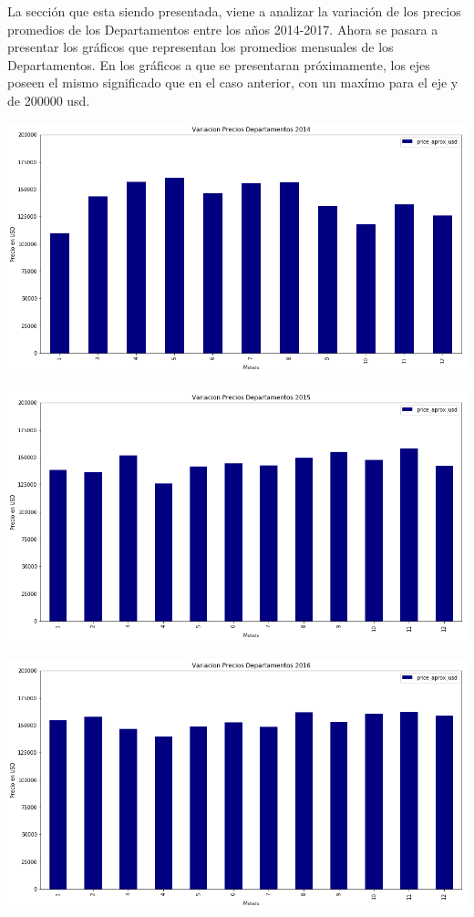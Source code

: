 \documentclass[a4paper, 10pt]{article}
\begin{document}
			La sección que esta siendo presentada, viene a analizar la variación de los precios promedios de los Departamentos entre los años 2014-2017. Ahora se pasara a presentar los gráficos que representan los promedios mensuales de los Departamentos. En los gráficos a que se presentaran próximamente, los ejes poseen el mismo significado que en el caso anterior, con un maxímo para el eje y de 200000 usd.

			\begin{center}
   		    		\includegraphics[width=\textwidth]{images/vDepto2014}
			\end{center}

			\begin{center}
   		    		\includegraphics[width=\textwidth]{images/vDepto2015}
			\end{center}

			\begin{center}
   		    		\includegraphics[width=\textwidth]{images/vDepto2016}
			\end{center}
\end{document}
